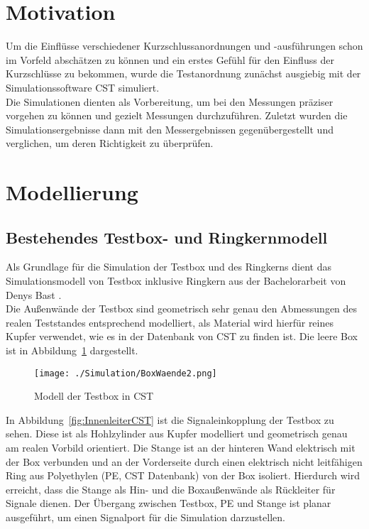     \section{Motivation}
    Um die Einflüsse verschiedener Kurzschlussanordnungen und -ausführungen schon im Vorfeld abschätzen zu können und ein erstes Gefühl für den Einfluss der Kurzschlüsse zu bekommen, wurde die Testanordnung zunächst ausgiebig mit der Simulationssoftware CST simuliert.\\
    Die Simulationen dienten als Vorbereitung, um bei den Messungen präziser vorgehen zu können und gezielt Messungen durchzuführen. Zuletzt wurden die Simulationsergebnisse dann mit den Messergebnissen gegenübergestellt und verglichen, um deren Richtigkeit zu überprüfen.
    
    \section{Modellierung}
        \subsection{Bestehendes Testbox- und Ringkernmodell}
        Als Grundlage für die Simulation der Testbox und des Ringkerns dient das Simulationsmodell von Testbox inklusive Ringkern aus der Bachelorarbeit von Denys Bast \cite{bast2017ba}.\\
        Die Außenwände der Testbox sind geometrisch sehr genau den Abmessungen des realen Teststandes entsprechend modelliert, als Material wird hierfür reines Kupfer verwendet, wie es in der Datenbank von CST zu finden ist. Die leere Box ist in Abbildung~\ref{fig:BoxCST} dargestellt.
        
            \begin{figure}[htb]
                \centering
                \texttt{[image: ./Simulation/BoxWaende2.png]}
                \caption{Modell der Testbox in CST}
                \label{fig:BoxCST}
            \end{figure}
        In Abbildung~\ref{fig:InnenleiterCST} ist die Signaleinkopplung der Testbox zu sehen.
        Diese ist als Hohlzylinder aus Kupfer modelliert und geometrisch genau am realen Vorbild orientiert. Die Stange ist an der hinteren Wand elektrisch mit der Box verbunden und an der Vorderseite durch einen elektrisch nicht leitfähigen Ring aus Polyethylen (PE, CST Datenbank) von der Box isoliert. Hierdurch wird erreicht, dass die Stange als Hin- und die Boxaußenwände als Rückleiter für Signale dienen. Der Übergang zwischen Testbox, PE und Stange ist planar ausgeführt, um einen Signalport für die Simulation darzustellen.
        
